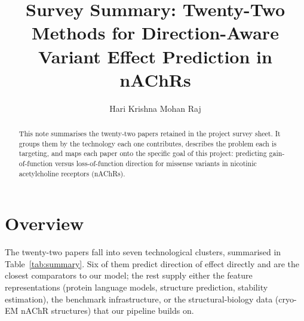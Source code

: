 \documentclass[11pt]{article}
\title{Survey Summary: Twenty-Two Methods for Direction-Aware\\ Variant Effect Prediction in nAChRs}
\author{Hari Krishna Mohan Raj}
\date{}
\begin{document}
\maketitle

\begin{abstract}
This note summarises the twenty-two papers retained in the project survey
sheet. It groups them by the technology each one contributes, describes the
problem each is targeting, and maps each paper onto the specific goal of this
project: predicting gain-of-function versus loss-of-function direction for
missense variants in nicotinic acetylcholine receptors (nAChRs).
\end{abstract}

\section{Overview}

The twenty-two papers fall into seven technological clusters, summarised in
Table~\ref{tab:summary}. Six of them predict direction of effect directly and
are the closest comparators to our model; the rest supply either the feature
representations (protein language models, structure prediction, stability
estimation), the benchmark infrastructure, or the structural-biology data
(cryo-EM nAChR structures) that our pipeline builds on.
\end{document}
